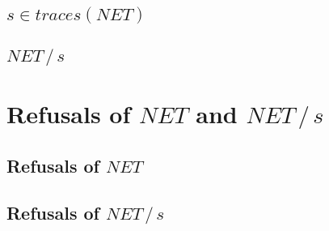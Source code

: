 \documentclass[11pt,a4paper]{article}
\def\after{\,/\,}
\begin{document}
\subsection{$s \in traces(NET)$}

\subsection{$NET \after s$}

\section{Refusals of $NET$ and $NET \after s$}

\subsection{Refusals of $NET$}

\subsection{Refusals of $NET \after s$}
\end{document}

